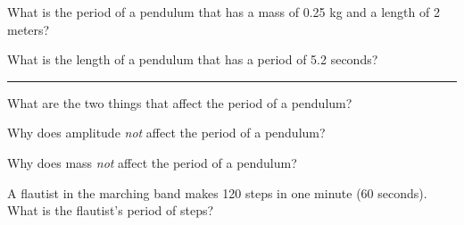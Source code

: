 \documentclass[10pt]{exam}
\begin{document}
\begin{questions}





\question
  What is the period of a pendulum that has a mass of 0.25 kg and a length of 2 meters?
  \vs[4]

\question
  What is the length of a pendulum that has a period of 5.2 seconds?
  \vs[4]

\hrule
\question
  What are the two things that affect the period of a pendulum?
  \vs

\question
  Why does amplitude \emph{not} affect the period of a pendulum?
  \vs[2]

\question
  Why does mass \emph{not} affect the period of a pendulum?
  \vs[2]

\question
  A flautist in the marching band makes 120 steps in one minute (60 seconds).  What is the flautist's period of steps? \vs




\end{questions}
\end{document}
